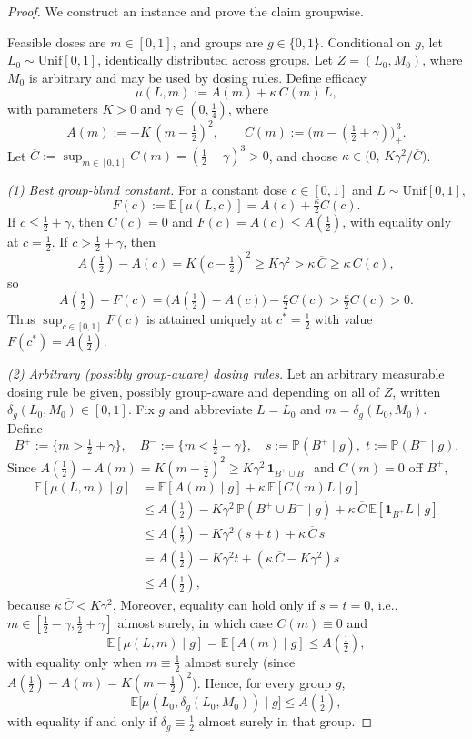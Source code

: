 \begin{proof}
We construct an instance and prove the claim groupwise.

Feasible doses are $m\in[0,1]$, and groups are $g\in\{0,1\}$. Conditional on $g$, let $L_0\sim\mathrm{Unif}[0,1]$, identically distributed across groups. Let $Z=(L_0,M_0)$, where $M_0$ is arbitrary and may be used by dosing rules. Define efficacy
\[
\mu(L,m) := A(m) + \kappa\,C(m)\,L,
\]
with parameters $K>0$ and $\gamma\in(0,\tfrac14)$, where
\[
A(m):= -K\,(m-\tfrac12)^2,\qquad C(m):= \big(m-(\tfrac12+\gamma)\big)_+^{\,3}.
\]
Let $\overline{C}:=\sup_{m\in[0,1]} C(m)=(\tfrac12-\gamma)^3>0$, and choose $\kappa\in\bigl(0,\,K\gamma^2/\overline{C}\bigr)$.

\medskip
\noindent\emph{(1) Best group-blind constant.} For a constant dose $c\in[0,1]$ and $L\sim\mathrm{Unif}[0,1]$,
\[
F(c):=\mathbb E[\mu(L,c)]=A(c)+\tfrac{\kappa}{2}C(c).
\]
If $c\le \tfrac12+\gamma$, then $C(c)=0$ and $F(c)=A(c)\le A(\tfrac12)$, with equality only at $c=\tfrac12$. If $c>\tfrac12+\gamma$, then
\[
A(\tfrac12)-A(c)=K(c-\tfrac12)^2\ge K\gamma^2>\kappa\,\overline{C}\ge \kappa\,C(c),
\]
so
\[
A(\tfrac12)-F(c)=\big(A(\tfrac12)-A(c)\big)-\tfrac{\kappa}{2}C(c)>\tfrac{\kappa}{2}C(c)>0.
\]
Thus $\sup_{c\in[0,1]} F(c)$ is attained uniquely at $c^*=\tfrac12$ with value $F(c^*)=A(\tfrac12)$.

\medskip
\noindent\emph{(2) Arbitrary (possibly group-aware) dosing rules.} Let an arbitrary measurable dosing rule be given, possibly group-aware and depending on all of $Z$, written $\delta_g(L_0,M_0)\in[0,1]$. Fix $g$ and abbreviate $L=L_0$ and $m=\delta_g(L_0,M_0)$. Define
\[
B^+ := \{m>\tfrac12+\gamma\},\quad B^- := \{m<\tfrac12-\gamma\},\quad s:=\mathbb P(B^+\mid g),\; t:=\mathbb P(B^-\mid g).
\]
Since $A(\tfrac12)-A(m)=K(m-\tfrac12)^2\ge K\gamma^2\,\mathbf{1}_{B^+\cup B^-}$ and $C(m)=0$ off $B^+$,
\begin{align*}
\mathbb E[\mu(L,m)\mid g]
&= \mathbb E[A(m)\mid g] + \kappa\,\mathbb E[C(m)L\mid g] \\
&\le A(\tfrac12) - K\gamma^2\,\mathbb P(B^+\cup B^-\mid g) + \kappa\,\overline{C}\,\mathbb E[\mathbf{1}_{B^+}L\mid g] \\
&\le A(\tfrac12) - K\gamma^2(s+t) + \kappa\,\overline{C}\,s \\
&= A(\tfrac12) - K\gamma^2 t + (\kappa\,\overline{C} - K\gamma^2) s \\
&\le A(\tfrac12),
\end{align*}
because $\kappa\,\overline{C} < K\gamma^2$. Moreover, equality can hold only if $s=t=0$, i.e., $m\in[\tfrac12-\gamma,\tfrac12+\gamma]$ almost surely, in which case $C(m)\equiv 0$ and
\[
\mathbb E[\mu(L,m)\mid g]=\mathbb E[A(m)\mid g]\le A(\tfrac12),
\]
with equality only when $m\equiv \tfrac12$ almost surely (since $A(\tfrac12)-A(m)=K(m-\tfrac12)^2$). Hence, for every group $g$,
\[
\mathbb E\big[\mu(L_0,\delta_g(L_0,M_0))\mid g\big]\le A(\tfrac12),
\]
with equality if and only if $\delta_g\equiv \tfrac12$ almost surely in that group.


\end{proof}
